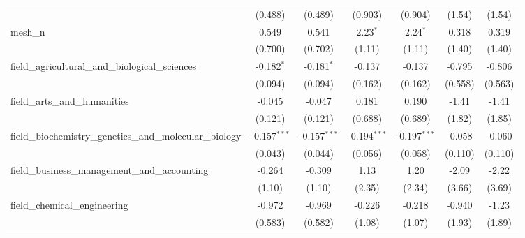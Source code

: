 \begin{tabular}{lcccccc}
                                                               & (0.488)        & (0.489)        & (0.903)        & (0.904)        & (1.54)        & (1.54)\\   
   mesh\_n                                                     & 0.549          & 0.541          & 2.23$^{*}$     & 2.24$^{*}$     & 0.318         & 0.319\\   
                                                               & (0.700)        & (0.702)        & (1.11)         & (1.11)         & (1.40)        & (1.40)\\   
   field\_agricultural\_and\_biological\_sciences              & -0.182$^{*}$   & -0.181$^{*}$   & -0.137         & -0.137         & -0.795        & -0.806\\   
                                                               & (0.094)        & (0.094)        & (0.162)        & (0.162)        & (0.558)       & (0.563)\\   
   field\_arts\_and\_humanities                                & -0.045         & -0.047         & 0.181          & 0.190          & -1.41         & -1.41\\   
                                                               & (0.121)        & (0.121)        & (0.688)        & (0.689)        & (1.82)        & (1.85)\\   
   field\_biochemistry\_genetics\_and\_molecular\_biology      & -0.157$^{***}$ & -0.157$^{***}$ & -0.194$^{***}$ & -0.197$^{***}$ & -0.058        & -0.060\\   
                                                               & (0.043)        & (0.044)        & (0.056)        & (0.058)        & (0.110)       & (0.110)\\   
   field\_business\_management\_and\_accounting                & -0.264         & -0.309         & 1.13           & 1.20           & -2.09         & -2.22\\   
                                                               & (1.10)         & (1.10)         & (2.35)         & (2.34)         & (3.66)        & (3.69)\\   
   field\_chemical\_engineering                                & -0.972         & -0.969         & -0.226         & -0.218         & -0.940        & -1.23\\   
                                                               & (0.583)        & (0.582)        & (1.08)         & (1.07)         & (1.93)        & (1.89)\\   

\end{tabular}
